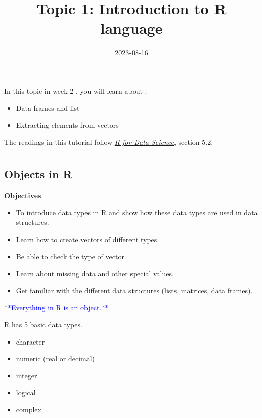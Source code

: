 \documentclass[
]{article}
\title{Topic 1: Introduction to R language}
\author{}
\date{\vspace{-2.5em}2023-08-16}
\providecommand{\tightlist}{%
  \setlength{\itemsep}{0pt}\setlength{\parskip}{0pt}}
\begin{document}
\maketitle

In this topic in week 2 , you will learn about :

\begin{itemize}
\tightlist
\item
  Data frames and list
\item
  Extracting elements from vectors
\end{itemize}

The readings in this tutorial follow
\href{http://r4ds.had.co.nz/}{\emph{R for Data Science}}, section 5.2.

\hypertarget{section}{%
\section{}\label{section}}

\hypertarget{objects-in-r}{%
\subsection{Objects in R}\label{objects-in-r}}

\textbf{Objectives}

\begin{itemize}
\tightlist
\item
  To introduce data types in R and show how these data types are used in
  data structures.
\item
  Learn how to create vectors of different types.
\item
  Be able to check the type of vector.
\item
  Learn about missing data and other special values.
\item
  Get familiar with the different data structures (lists, matrices, data
  frames).
\end{itemize}

\textcolor{blue}{**Everything in R is an object.**}

R has 5 basic data types.

\begin{itemize}
\tightlist
\item
  character
\item
  numeric (real or decimal)
\item
  integer
\item
  logical
\item
  complex
\end{itemize}
\end{document}
